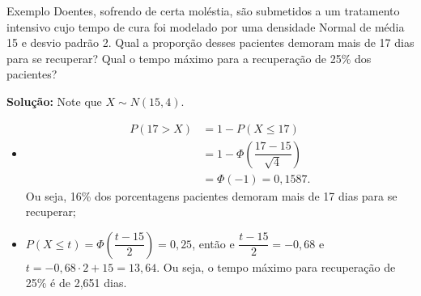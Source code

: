\documentclass[9pt]{beamer}
\begin{document}
\begin{frame}{Exemplo}
 Doentes, sofrendo de certa moléstia, são submetidos a um tratamento intensivo cujo tempo de cura foi modelado por uma densidade Normal de média 15 e desvio padrão 2. Qual a proporção desses pacientes
 demoram mais de 17 dias para se recuperar? Qual o tempo máximo para a recuperação de 25\% dos pacientes?
 
 \textbf{Solução:}
 Note que $X \sim N(15, 4)$.
 \begin{itemize}
  \item 
  \begin{align*}
  P(17 > X) &= 1 -  P(X \leq 17)\\
   &= 1 - \Phi\left( \dfrac{17-15}{\sqrt{4}} \right)\\
   &=\Phi(-1) = 0,1587.
  \end{align*}
  Ou seja, 16\% dos porcentagens pacientes demoram mais de 17 dias para se recuperar;
  \item $P(X \leq t) = \Phi\left( \dfrac{t-15}{2} \right) = 0,25$, então e $\dfrac{t-15}{2} = -0,68$ e $t = -0,68 \cdot 2 + 15 = 13,64$. Ou seja, o tempo máximo para recuperação de 25\% é de 2,651 dias.
 \end{itemize}
\end{frame}
\end{document}
